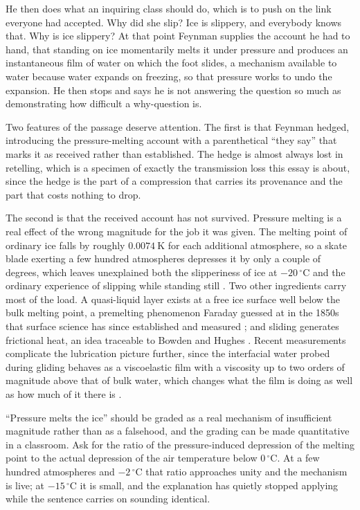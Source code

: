 He then does what an inquiring class should do, which is to push on the link everyone had accepted. Why did she slip? Ice is slippery, and everybody knows that. Why is ice slippery? At that point Feynman supplies the account he had to hand, that standing on ice momentarily melts it under pressure and produces an instantaneous film of water on which the foot slides, a mechanism available to water because water expands on freezing, so that pressure works to undo the expansion. He then stops and says he is not answering the question so much as demonstrating how difficult a why-question is.

Two features of the passage deserve attention. The first is that Feynman hedged, introducing the pressure-melting account with a parenthetical ``they say'' that marks it as received rather than established. The hedge is almost always lost in retelling, which is a specimen of exactly the transmission loss this essay is about, since the hedge is the part of a compression that carries its provenance and the part that costs nothing to drop.

The second is that the received account has not survived. Pressure melting is a real effect of the wrong magnitude for the job it was given. The melting point of ordinary ice falls by roughly $0.0074\ \mathrm{K}$ for each additional atmosphere, so a skate blade exerting a few hundred atmospheres depresses it by only a couple of degrees, which leaves unexplained both the slipperiness of ice at $-20\,^{\circ}\mathrm{C}$ and the ordinary experience of slipping while standing still \citep{rosenberg2005}. Two other ingredients carry most of the load. A quasi-liquid layer exists at a free ice surface well below the bulk melting point, a premelting phenomenon Faraday guessed at in the 1850s that surface science has since established and measured \citep{dash2006,weber2018}; and sliding generates frictional heat, an idea traceable to Bowden and Hughes \citep{bowden1939}. Recent measurements complicate the lubrication picture further, since the interfacial water probed during gliding behaves as a viscoelastic film with a viscosity up to two orders of magnitude above that of bulk water, which changes what the film is doing as well as how much of it there is \citep{canale2019}.

\begin{provenance}
``Pressure melts the ice'' should be graded as a real mechanism of insufficient magnitude rather than as a falsehood, and the grading can be made quantitative in a classroom. Ask for the ratio of the pressure-induced depression of the melting point to the actual depression of the air temperature below $0\,^{\circ}\mathrm{C}$. At a few hundred atmospheres and $-2\,^{\circ}\mathrm{C}$ that ratio approaches unity and the mechanism is live; at $-15\,^{\circ}\mathrm{C}$ it is small, and the explanation has quietly stopped applying while the sentence carries on sounding identical.
\end{provenance}

